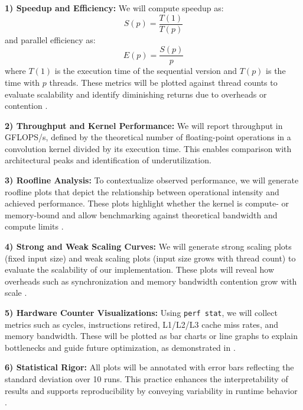 \documentclass[conference, 10pt]{IEEEtran}
\begin{document}
\vspace{0.5em}
\textbf{1) Speedup and Efficiency:} 
We will compute speedup as:
\begin{equation}
    S(p) = \frac{T(1)}{T(p)}
\end{equation}
and parallel efficiency as:
\begin{equation}
    E(p) = \frac{S(p)}{p}
\end{equation}
where \(T(1)\) is the execution time of the sequential version and \(T(p)\) is the time with \(p\) threads. These metrics will be plotted against thread counts to evaluate scalability and identify diminishing returns due to overheads or contention \cite{bhattacharjee2020analyzing}.

\vspace{0.5em}
\textbf{2) Throughput and Kernel Performance:} 
We will report throughput in GFLOPS/s, defined by the theoretical number of floating-point operations in a convolution kernel divided by its execution time. This enables comparison with architectural peaks and identification of underutilization.

\vspace{0.5em}
\textbf{3) Roofline Analysis:} 
To contextualize observed performance, we will generate roofline plots that depict the relationship between operational intensity and achieved performance. These plots highlight whether the kernel is compute- or memory-bound and allow benchmarking against theoretical bandwidth and compute limits \cite{williams2009roofline}.

\vspace{0.5em}
\textbf{4) Strong and Weak Scaling Curves:} 
We will generate strong scaling plots (fixed input size) and weak scaling plots (input size grows with thread count) to evaluate the scalability of our implementation. These plots will reveal how overheads such as synchronization and memory bandwidth contention grow with scale \cite{hager2011hpc}.

\vspace{0.5em}
\textbf{5) Hardware Counter Visualizations:} 
Using \texttt{perf stat}, we will collect metrics such as cycles, instructions retired, L1/L2/L3 cache miss rates, and memory bandwidth. These will be plotted as bar charts or line graphs to explain bottlenecks and guide future optimization, as demonstrated in \cite{chen2021benchmarking, imran2022openmp}.

\vspace{0.5em}
\textbf{6) Statistical Rigor:} 
All plots will be annotated with error bars reflecting the standard deviation over 10 runs. This practice enhances the interpretability of results and supports reproducibility by conveying variability in runtime behavior \cite{chen2021benchmarking}.
\end{document}
